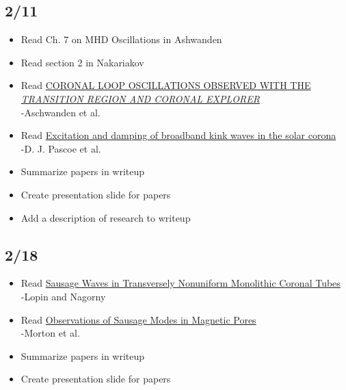 \documentclass[12pt]{article}
\begin{document}
\subsection*{2/11}
\begin{itemize}
    \item Read Ch. 7 on MHD Oscillations in Ashwanden
    \item Read section 2 in Nakariakov
    \item Read
        \href{http://adsabs.harvard.edu/abs/1999ApJ...520..880A}
        {\textcolor{cobalt}{CORONAL LOOP OSCILLATIONS OBSERVED WITH THE
        \emph{TRANSITION REGION AND CORONAL EXPLORER}}}\\
        -Aschwanden et al.
    \item Read
        \href{http://cdsads.u-strasbg.fr/abs/2015A\%26A...578A..99P}
        {\textcolor{cobalt}{Excitation and damping of broadband
        kink waves in the solar corona}}\\
        -D. J. Pascoe et al.
    \item Summarize papers in writeup
    \item Create presentation slide for papers
    \item Add a description of research to writeup
\end{itemize}

\subsection*{2/18}
\begin{itemize}
    \item Read
        \href{http://adsabs.harvard.edu/abs/2015ApJ...810...87L}
        {\textcolor{cobalt}{Sausage Waves in Transversely
        Nonuniform Monolithic Coronal Tubes}}\\
        -Lopin and Nagorny
    \item Read
        \href{http://cdsads.u-strasbg.fr/abs/2011ApJ...729L..18M}
        {\textcolor{cobalt}{Observations of Sausage Modes in Magnetic Pores}}\\
        -Morton et al.
    \item Summarize papers in writeup
    \item Create presentation slide for papers
\end{itemize}
\end{document}
